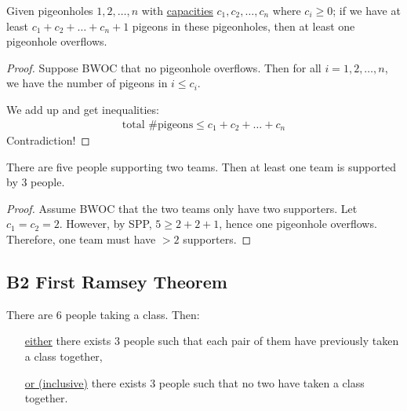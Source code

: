 \documentclass[12pt]{article}
\begin{document}
\begin{theorem}
    Given pigeonholes $1,2,\dots,n$ with \uline{capacities} $c_1,c_2,\dots, c_n$ where $c_i\geq 0$; if we have at least $c_1+c_2+\dots+c_n+1$ pigeons in these pigeonholes, then at least one pigeonhole overflows.
\end{theorem}
\begin{proof}
    Suppose BWOC that no pigeonhole overflows. Then for all $i=1,2,\dots,n$, we have the number of pigeons in $i\leq c_i$.

    We add up and get inequalities:\begin{align*}
        \text{total \# pigeons} \leq c_1+c_2+\dots + c_n
    \end{align*}
    Contradiction!
\end{proof}

\eg There are five people supporting two teams. Then at least one team is supported by 3 people.
\begin{proof}
    Assume BWOC that the two teams only have two supporters. Let $c_1=c_2=2$. However, by SPP, $5\geq 2+2+1$, hence one pigeonhole overflows. Therefore, one team must have $>2$ supporters.
\end{proof}

\subsection{B2 First Ramsey Theorem}

There are 6 people taking a class. Then: \begin{itemize}[align=left]
        \item[\underline{either}] there exists 3 people such that each pair of them have previously taken a class together,
        \item[\underline{or (inclusive)}] there exists 3 people such that no two have taken a class together.
    \end{itemize}
\end{document}
